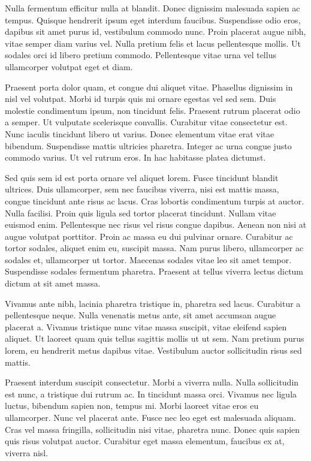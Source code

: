 Nulla fermentum efficitur nulla at blandit. Donec dignissim malesuada sapien ac tempus. Quisque hendrerit ipsum eget interdum faucibus. Suspendisse odio eros, dapibus sit amet purus id, vestibulum commodo nunc. Proin placerat augue nibh, vitae semper diam varius vel. Nulla pretium felis et lacus pellentesque mollis. Ut sodales orci id libero pretium commodo. Pellentesque vitae urna vel tellus ullamcorper volutpat eget et diam.

Praesent porta dolor quam, et congue dui aliquet vitae. Phasellus dignissim in nisl vel volutpat. Morbi id turpis quis mi ornare egestas vel sed sem. Duis molestie condimentum ipsum, non tincidunt felis. Praesent rutrum placerat odio a semper. Ut vulputate scelerisque convallis. Curabitur vitae consectetur est. Nunc iaculis tincidunt libero ut varius. Donec elementum vitae erat vitae bibendum. Suspendisse mattis ultricies pharetra. Integer ac urna congue justo commodo varius. Ut vel rutrum eros. In hac habitasse platea dictumst.

Sed quis sem id est porta ornare vel aliquet lorem. Fusce tincidunt blandit ultrices. Duis ullamcorper, sem nec faucibus viverra, nisi est mattis massa, congue tincidunt ante risus ac lacus. Cras lobortis condimentum turpis at auctor. Nulla facilisi. Proin quis ligula sed tortor placerat tincidunt. Nullam vitae euismod enim. Pellentesque nec risus vel risus congue dapibus. Aenean non nisi at augue volutpat porttitor. Proin ac massa eu dui pulvinar ornare. Curabitur ac tortor sodales, aliquet enim eu, suscipit massa. Nam purus libero, ullamcorper ac sodales et, ullamcorper ut tortor. Maecenas sodales vitae leo sit amet tempor. Suspendisse sodales fermentum pharetra. Praesent at tellus viverra lectus dictum dictum at sit amet massa.

Vivamus ante nibh, lacinia pharetra tristique in, pharetra sed lacus. Curabitur a pellentesque neque. Nulla venenatis metus ante, sit amet accumsan augue placerat a. Vivamus tristique nunc vitae massa suscipit, vitae eleifend sapien aliquet. Ut laoreet quam quis tellus sagittis mollis ut ut sem. Nam pretium purus lorem, eu hendrerit metus dapibus vitae. Vestibulum auctor sollicitudin risus sed mattis.

Praesent interdum suscipit consectetur. Morbi a viverra nulla. Nulla sollicitudin est nunc, a tristique dui rutrum ac. In tincidunt massa orci. Vivamus nec ligula luctus, bibendum sapien non, tempus mi. Morbi laoreet vitae eros eu ullamcorper. Nunc vel placerat ante. Fusce nec leo eget est malesuada aliquam. Cras vel massa fringilla, sollicitudin nisi vitae, pharetra nunc. Donec quis sapien quis risus volutpat auctor. Curabitur eget massa elementum, faucibus ex at, viverra nisl.

